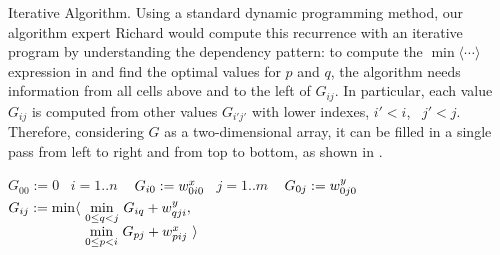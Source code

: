 \begin{paragraph}{Iterative Algorithm.}
Using a standard dynamic programming method, our algorithm expert Richard would compute this recurrence
with an iterative program by understanding the dependency pattern:
to compute the $\min\langle\cdots\rangle$ expression in  and find the optimal
values for $p$ and $q$, the algorithm needs information from all cells above and to the left of $G_{ij}$.
In particular, each value $G_{ij}$ is computed from other values $G_{i'j'}$ with lower
indexes, $i'<i$, ~$j'<j$. 
Therefore, considering $G$ as a two-dimensional array, it can be filled in a single pass from left to right and from top
to bottom, as shown in .
\end{paragraph}

\newcommand\FORLINE[1]{\State\algorithmicfor~{#1} \algorithmicdo~}
\newcommand\Head[1]{\Comment{ {\it #1} ~~}}

\begin{algorithm}
\renewcommand\arraystretch{1.3}
\begin{algorithmic}
  \State $G_{00} := 0$    \Head{Initialize}
  \FORLINE{$i=1..n$}  $G_{i0} := w^x_{0i0}$
  \FORLINE{$j=1..m$}  $G_{0j} := w^y_{0j0}$  
            \Head{Compute}
      \State $G_{ij} :=
        \begin{array}[t]{@{}l@{~}l} 
          \min\langle & \underset{0\leq q<j}\min ~ G_{iq} + \yw{qji}, \\
                      & \underset{0\leq p<i}\min ~ G_{pj} + \xw{pij}~\rangle \\         
        \end{array}$
    \EndFor
  \EndFor
\end{algorithmic}
\caption{\label{overview:iterative}
   Iterative Simplified Arbiter}
\end{algorithm}



\newcommand\qbox[1]{\fbox{\rm\scriptsize#1}}
\newcommand\tinyqbox[1]{\hspace{.5pt}\tikz \node[draw,inner sep=1.5pt] {$\scriptscriptstyle #1$};}

\newcommand\plusoneocd{\raisebox{.5pt}{$\scriptstyle+1$}}


